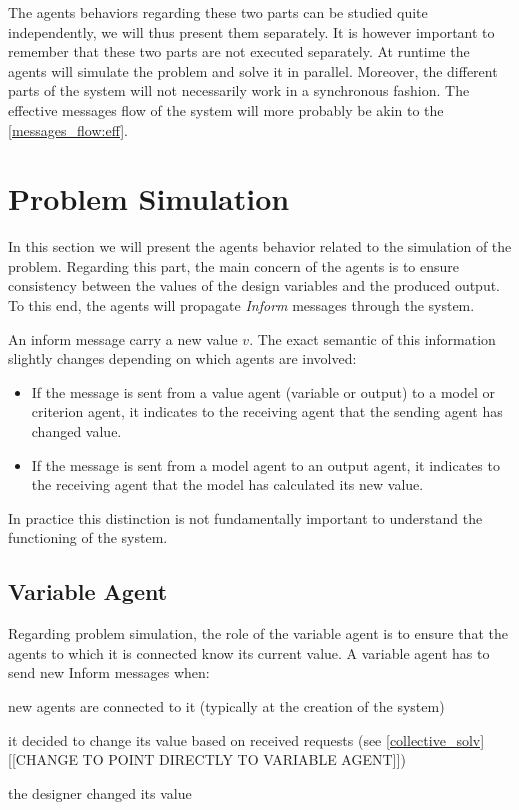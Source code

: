 The agents behaviors regarding these two parts can be studied quite independently, we will thus present them separately.  It is however important to remember that these two parts are not executed separately. At runtime the agents will simulate the problem and solve it in parallel. Moreover, the different parts of the system will not necessarily work in a synchronous fashion. The effective messages flow of the system will more probably be akin to the \figurename{} \ref{messages_flow:eff}.

\section{Problem Simulation}

In this section we will present the agents behavior related to the simulation of the problem. Regarding this part, the main concern of the agents is to ensure consistency between the values of the design variables and the produced output. To this end, the agents will propagate \emph{Inform} messages through the system.

An inform message carry a new value $v$. The exact semantic of this information slightly changes depending on which agents are involved:

\begin{itemize}
\item If the message is sent from a value agent (variable or output) to a model or criterion agent, it indicates to the receiving agent that the sending agent has changed value.

\item If the message is sent from a model agent to an output agent, it indicates to the receiving agent that the model has calculated its new value.
\end{itemize}

In practice this distinction is not fundamentally important to understand the functioning of the system.

\subsection{Variable Agent}

Regarding problem simulation, the role of the variable agent is to ensure that the agents to which it is connected know its current value.
A variable agent has to send new Inform messages when:
\begin{compactitem}
\item new agents are connected to it (typically at the creation of the system)
\item it decided to change its value based on received requests (see \ref{collective_solv}[[CHANGE TO POINT DIRECTLY TO VARIABLE AGENT]])
\item the designer changed its value
\end{compactitem}

